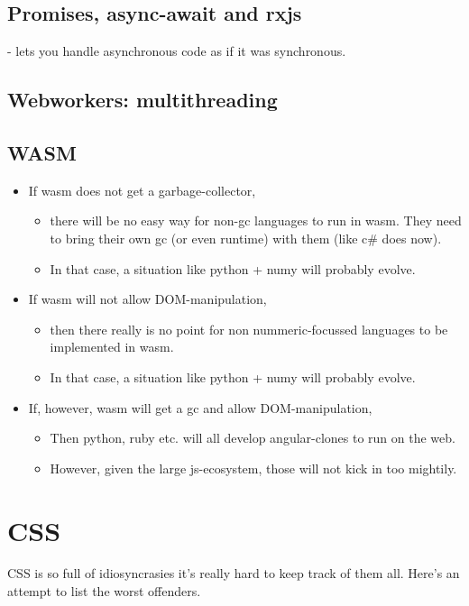 \subsection{Promises, async-await and rxjs}
 -  lets you handle asynchronous code as if it was synchronous. 

\subsection{Webworkers: multithreading}


\subsection{WASM}
\begin{itemize}
    \item If wasm does not get a garbage-collector, 
        \begin{itemize}
            \item there will be no easy way for non-gc languages to run in wasm. They need to bring their own gc (or even runtime) with them (like c\# does now). 
            \item In that case, a situation like python + numy will probably evolve.
        \end{itemize}
    \item If wasm will not allow DOM-manipulation, 
        \begin{itemize}
            \item then there really is no point for non nummeric-focussed languages to be implemented in wasm.
            \item In that case, a situation like python + numy will probably evolve.
        \end{itemize}
    \item If, however, wasm will get a gc and allow DOM-manipulation, 
        \begin{itemize}
            \item Then python, ruby etc. will all develop angular-clones to run on the web. 
            \item However, given the large js-ecosystem, those will not kick in too mightily. 
        \end{itemize}
\end{itemize}


\section{CSS}
CSS is so full of idiosyncrasies it's really hard to keep track of them all. Here's an attempt to list the worst offenders.

